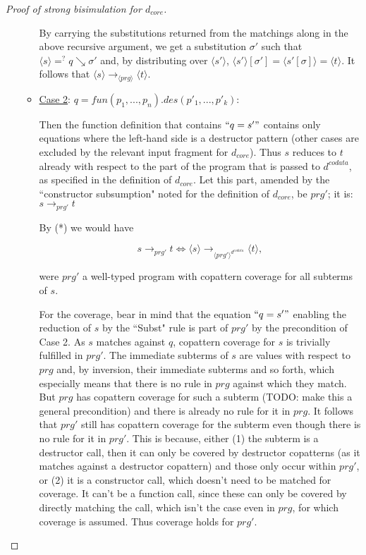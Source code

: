 \begin{proof}[Proof of strong bisimulation for $d_{core}$]
\begin{enumerate}
\begin{itemize}
By carrying the substitutions returned from the matchings along in the above recursive argument, we get a substitution $\sigma'$ such that $\langle s \rangle =^? q \searrow \sigma'$ and, by distributing over $\langle s' \rangle$, $\langle s' \rangle [\sigma'] = \langle s'[\sigma] \rangle = \langle t \rangle$. It follows that $\langle s \rangle \longrightarrow_{\langle prg \rangle} \langle t \rangle$.

\item \underline{Case 2}: $q = fun(p_1, ..., p_n).des(p'_1, ..., p'_k)$:

Then the function definition that contains $`` q = s' "$ contains only equations where the left-hand side is a destructor pattern (other cases are excluded by the relevant input fragment for $d_{core}$). Thus $s$ reduces to $t$ already with respect to the part of the program that is passed to $d^{codata}$, as specified in the definition of $d_{core}$. Let this part, amended by the ``constructor subsumption" noted for the definition of $d_{core}$, be $prg'$; it is: $s \longrightarrow_{prg'} t$

By (*) we would have

\begin{equation*}
s \longrightarrow_{prg'} t \iff \langle s \rangle \longrightarrow_{\langle prg' \rangle^{d^{codata}}} \langle t \rangle,
\end{equation*}

were $prg'$ a well-typed program with copattern coverage for all subterms of $s$. 

For the coverage, bear in mind that the equation $`` q = s' "$ enabling the reduction of $s$ by the ``Subst" rule is part of $prg'$ by the precondition of Case 2. As $s$ matches against $q$, copattern coverage for $s$ is trivially fulfilled in $prg'$. The immediate subterms of $s$ are values with respect to $prg$ and, by inversion, their immediate subterms and so forth, which especially means that there is no rule in $prg$ against which they match. But $prg$ has copattern coverage for such a subterm (TODO: make this a general precondition) and there is already no rule for it in $prg$. It follows that $prg'$ still has copattern coverage for the subterm even though there is no rule for it in $prg'$. This is because, either (1) the subterm is a destructor call, then it can only be covered by destructor copatterns (as it matches against a destructor copattern) and those only occur within $prg'$, or (2) it is a constructor call, which doesn't need to be matched for coverage. It can't be a function call, since these can only be covered by directly matching the call, which isn't the case even in $prg$, for which coverage is assumed. Thus coverage holds for $prg'$.


\end{itemize}
\end{enumerate}
\end{proof}
